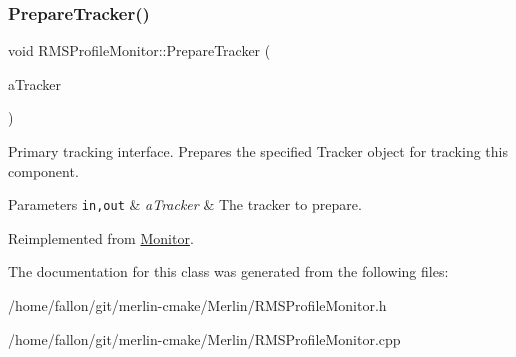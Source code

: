 \mbox{\label{classRMSProfileMonitor_ae5c6ecda857727f6ac78da99b08c88c1}} 
\subsubsection{\texorpdfstring{Prepare\+Tracker()}{PrepareTracker()}}
{\footnotesize\ttfamily void R\+M\+S\+Profile\+Monitor\+::\+Prepare\+Tracker (\begin{DoxyParamCaption}\item[{\hyperlink{classComponentTracker}{Component\+Tracker} \&}]{a\+Tracker }\end{DoxyParamCaption})\hspace{0.3cm}{\ttfamily [virtual]}}

Primary tracking interface. Prepares the specified Tracker object for tracking this component. 
\begin{DoxyParams}[1]{Parameters}
\mbox{\tt in,out}  & {\em a\+Tracker} & The tracker to prepare. \\
\hline
\end{DoxyParams}


Reimplemented from \hyperlink{classMonitor_a8d5e3ab0d68f89a51aabdcde2b01977a}{Monitor}.



The documentation for this class was generated from the following files\+:\begin{DoxyCompactItemize}
\item 
/home/fallon/git/merlin-\/cmake/\+Merlin/R\+M\+S\+Profile\+Monitor.\+h\item 
/home/fallon/git/merlin-\/cmake/\+Merlin/R\+M\+S\+Profile\+Monitor.\+cpp\end{DoxyCompactItemize}
